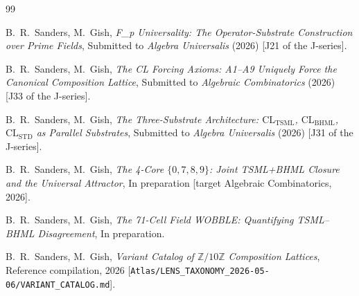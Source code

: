 \documentclass[11pt,reqno]{amsart}
\theoremstyle{plain}
\theoremstyle{definition}
\theoremstyle{remark}
\newcommand{\Z}{\mathbb{Z}}
\newcommand{\TSML}{\mathrm{TSML}}
\newcommand{\BHML}{\mathrm{BHML}}
\begin{document}
\begin{thebibliography}{99}

B.~R.~Sanders, M.~Gish,
\emph{F_p Universality: The Operator-Substrate Construction over Prime Fields},
Submitted to \emph{Algebra Universalis} (2026)
[J21 of the J-series].

B.~R.~Sanders, M.~Gish,
\emph{The CL Forcing Axioms: A1--A9 Uniquely Force the Canonical Composition Lattice},
Submitted to \emph{Algebraic Combinatorics} (2026)
[J33 of the J-series].

B.~R.~Sanders, M.~Gish,
\emph{The Three-Substrate Architecture: $\mathrm{CL}_\TSML$, $\mathrm{CL}_\BHML$, $\mathrm{CL}_\mathrm{STD}$ as Parallel Substrates},
Submitted to \emph{Algebra Universalis} (2026)
[J31 of the J-series].

B.~R.~Sanders, M.~Gish,
\emph{The 4-Core $\{0,7,8,9\}$: Joint TSML+BHML Closure and the Universal Attractor},
In preparation [target Algebraic Combinatorics, 2026].

B.~R.~Sanders, M.~Gish,
\emph{The 71-Cell Field WOBBLE: Quantifying TSML--BHML Disagreement},
In preparation.

B.~R.~Sanders, M.~Gish,
\emph{Variant Catalog of $\Z/10\Z$ Composition Lattices},
Reference compilation, 2026
[\texttt{Atlas/LENS\_TAXONOMY\_2026-05-06/VARIANT\_CATALOG.md}].

\end{thebibliography}
\end{document}
